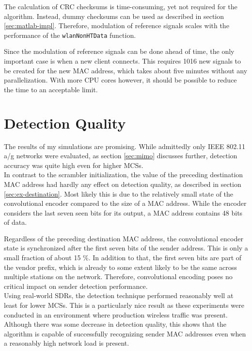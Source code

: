 The calculation of \gls{CRC} checksums is time-consuming, yet not required for the algorithm. Instead, dummy checksums can be used as described in section \ref{sec:matlab-impl}. Therefore, modulation of reference signals scales with the performance of the \texttt{wlanNonHTData} function.

Since the modulation of reference signals can be done ahead of time, the only important case is when a new client connects. This requires 1016 new signals to be created for the new \gls{MAC} address, which takes about five minutes without any parallelization. With more CPU cores however, it should be possible to reduce the time to an acceptable limit.



\section{Detection Quality}\label{sec:detection-quality}

The results of my simulations are promising. While admittedly only IEEE 802.11 a/g networks were evaluated, as section \ref{sec:mimo} discusses further, detection accuracy was quite high even for higher \glspl{MCS}.\\

In contrast to the scrambler initialization, the value of the preceding destination \gls{MAC} address had hardly any effect on detection quality, as described in section \ref{sec:ex-destination}. Most likely this is due to the relatively small state of the convolutional encoder compared to the size of a \gls{MAC} address. While the encoder considers the last seven seen bits for its output, a \gls{MAC} address contains 48 bits of data.

Regardless of the preceding destination \gls{MAC} address, the convolutional encoder state is synchronized after the first seven bits of the sender address. This is only a small fraction of about 15 \%. In addition to that, the first seven bits are part of the vendor prefix, which is already to some extent likely to be the same across multiple stations on the network. Therefore, convolutional encoding poses no critical impact on sender detection performance.\\

Using real-world \glspl{SDR}, the detection technique performed reasonably well at least for lower \glspl{MCS}. This is a particularly nice result as these experiments were conducted in an environment where production wireless traffic was present. Although there was some decrease in detection quality, this shows that the algorithm is capable of successfully recognizing sender \gls{MAC} addresses even when a reasonably high network load is present.


